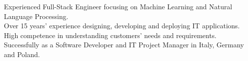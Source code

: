 %
%
%
\par{
Experienced Full-Stack Engineer focusing on Machine Learning and Natural Language Processing. \\
Over 15 years' experience designing, developing and deploying IT applications. \\
High competence in understanding customers' needs and requirements. \\
Successfully as a Software Developer and IT Project Manager in Italy, Germany and Poland.  \\
}
